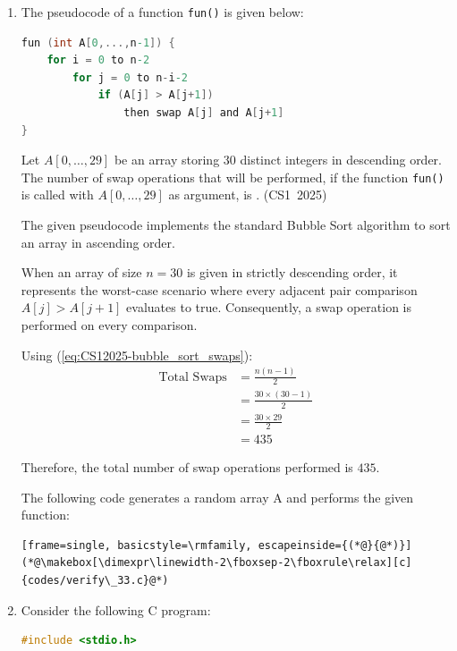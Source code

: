 \begin{enumerate}[label=\thesubsection.\arabic*, ref=\thesubsection.\theenumi]
Therefore, the probability that the chosen coin is the fake coin is $0.50$.

\vspace{0.5cm}
\item The pseudocode of a function \texttt{fun()} is given below:
\begin{lstlisting}[language=C]
fun (int A[0,...,n-1]) {
    for i = 0 to n-2
        for j = 0 to n-i-2
            if (A[j] > A[j+1])
                then swap A[j] and A[j+1]
}
\end{lstlisting}
Let $A[0,\dots,29]$ be an array storing 30 distinct integers in descending order. The number of swap operations that will be performed, if the function \texttt{fun()} is called with $A[0,\dots,29]$ as argument, is \underline{\hspace{1cm}}.
\hfill (CS1~2025)

\vspace{0.2cm}
\solution
The given pseudocode implements the standard Bubble Sort algorithm to sort an array in ascending order.

When an array of size $n = 30$ is given in strictly descending order, it represents the worst-case scenario where every adjacent pair comparison $A[j] > A[j+1]$ evaluates to true. Consequently, a swap operation is performed on every comparison.

Using (\ref{eq:CS12025-bubble_sort_swaps}):
\begin{align}
\text{Total Swaps} &= \frac{n(n - 1)}{2} \\
                   &= \frac{30 \times (30 - 1)}{2} \\
                   &= \frac{30 \times 29}{2} \\
                   &= 435
\end{align}

Therefore, the total number of swap operations performed is $435$.

The following code generates a random array A and performs the given function:
\begin{lstlisting}[frame=single, basicstyle=\rmfamily, escapeinside={(*@}{@*)}]
(*@\makebox[\dimexpr\linewidth-2\fboxsep-2\fboxrule\relax][c]{codes/verify\_33.c}@*)
\end{lstlisting}

\vspace{0.5cm}
\item Consider the following C program:
\begin{lstlisting}[language=C]
#include <stdio.h>


\end{lstlisting}
\end{enumerate}
